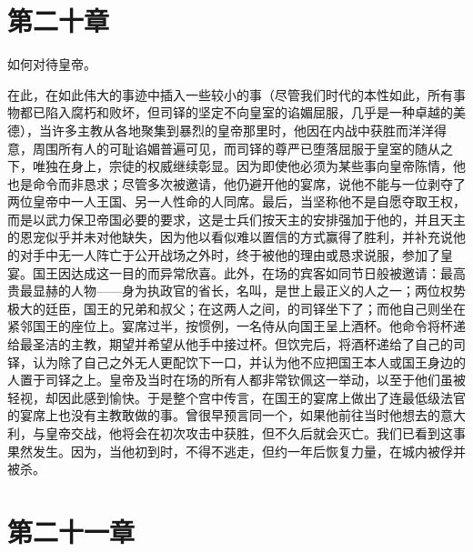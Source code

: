 
\section{第二十章}

如何对待皇帝。\par

在此，在如此伟大的事迹中插入一些较小的事（尽管我们时代的本性如此，所有事物都已陷入腐朽和败坏，但司铎的坚定不向皇室的谄媚屈服，几乎是一种卓越的美德），当许多主教从各地聚集到暴烈的皇帝那里时，他因在内战中获胜而洋洋得意，周围所有人的可耻谄媚普遍可见，而司铎的尊严已堕落屈服于皇室的随从之下，唯独在身上，宗徒的权威继续彰显。因为即使他必须为某些事向皇帝陈情，他也是命令而非恳求；尽管多次被邀请，他仍避开他的宴席，说他不能与一位剥夺了两位皇帝中一人王国、另一人性命的人同席。最后，当坚称他不是自愿夺取王权，而是以武力保卫帝国必要的要求，这是士兵们按天主的安排强加于他的，并且天主的恩宠似乎并未对他缺失，因为他以看似难以置信的方式赢得了胜利，并补充说他的对手中无一人阵亡于公开战场之外时，终于被他的理由或恳求说服，参加了皇宴。国王因达成这一目的而异常欣喜。此外，在场的宾客如同节日般被邀请：最高贵最显赫的人物——身为执政官的省长，名叫，是世上最正义的人之一；两位权势极大的廷臣，国王的兄弟和叔父；在这两人之间，的司铎坐下了；而他自己则坐在紧邻国王的座位上。宴席过半，按惯例，一名侍从向国王呈上酒杯。他命令将杯递给最圣洁的主教，期望并希望从他手中接过杯。但饮完后，将酒杯递给了自己的司铎，认为除了自己之外无人更配饮下一口，并认为他不应把国王本人或国王身边的人置于司铎之上。皇帝及当时在场的所有人都非常钦佩这一举动，以至于他们虽被轻视，却因此感到愉快。于是整个宫中传言，在国王的宴席上做出了连最低级法官的宴席上也没有主教敢做的事。曾很早预言同一个，如果他前往当时他想去的意大利，与皇帝交战，他将会在初次攻击中获胜，但不久后就会灭亡。我们已看到这事果然发生。因为，当他初到时，不得不逃走，但约一年后恢复力量，在城内被俘并被杀。\par


\section{第二十一章}

